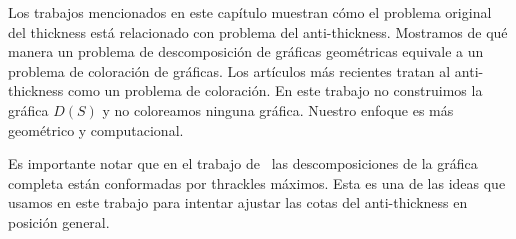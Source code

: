 Los trabajos mencionados en este capítulo muestran cómo el problema original del
thickness está relacionado con problema del anti-thickness. Mostramos de qué manera
un problema de descomposición de gráficas geométricas equivale
a un problema de coloración de gráficas. Los artículos más recientes tratan al
anti-thickness como un problema de coloración. En este trabajo no construimos la
gráfica $D(S)$ y no coloreamos ninguna gráfica. Nuestro enfoque es más geométrico
y computacional.


Es importante notar que en el trabajo de~\cite{Fabila-Monroy2018} las descomposiciones
de la gráfica completa están conformadas por thrackles máximos. Esta es una de las ideas que
usamos en este trabajo para intentar ajustar las cotas del anti-thickness en posición
general.
